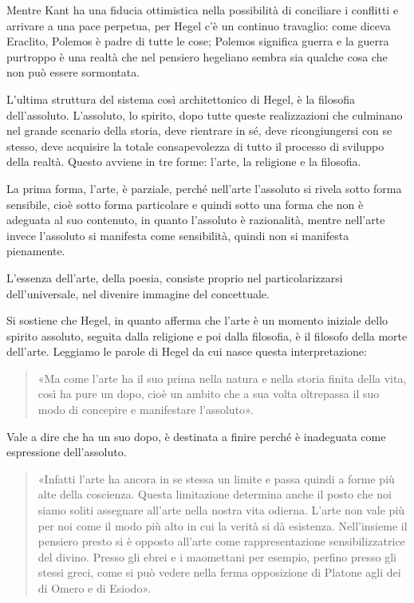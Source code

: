 \documentclass[a4paper,12pt,oneside,openany]{book}%
\begin{document}
Mentre Kant ha una fiducia ottimistica nella possibilità di conciliare i conflitti e arrivare a una pace perpetua, per Hegel c’è un continuo travaglio: come diceva Eraclito, Polemos è padre di tutte le cose; Polemos significa guerra e la guerra purtroppo è una realtà che nel pensiero hegeliano sembra sia qualche cosa che non può essere sormontata.

L’ultima struttura del sistema così architettonico di Hegel, è la filosofia dell’assoluto. L’assoluto, lo spirito, dopo tutte queste realizzazioni che culminano nel grande scenario della storia, deve rientrare in sé, deve ricongiungersi con se stesso, deve acquisire la totale consapevolezza di tutto il processo di sviluppo della realtà. Questo avviene in tre forme: l’arte, la religione e la filosofia.

La prima forma, l’arte, è parziale, perché nell’arte l’assoluto si rivela sotto forma sensibile, cioè sotto forma particolare e quindi sotto una forma che non è adeguata al suo contenuto, in quanto l’assoluto è razionalità, mentre nell’arte invece l’assoluto si manifesta come sensibilità, quindi non si manifesta pienamente.

L’essenza dell’arte, della poesia, consiste proprio nel particolarizzarsi dell’universale, nel divenire immagine del concettuale.

Si sostiene che Hegel, in quanto afferma che l’arte è un momento iniziale dello spirito assoluto, seguita dalla religione e poi dalla filosofia, è il filosofo della morte dell’arte. Leggiamo le parole di Hegel da cui nasce questa interpretazione:

\begin{quotation}
	«Ma come l’arte ha il suo prima nella natura e nella storia finita della vita, così ha pure un dopo, cioè un ambito che a sua volta oltrepassa il suo modo di concepire e manifestare l’assoluto».
\end{quotation}

Vale a dire che ha un suo dopo, è destinata a finire perché è inadeguata come espressione dell’assoluto.

\begin{quotation}
	«Infatti l’arte ha ancora in se stessa un limite e passa quindi a forme più alte della coscienza. Questa limitazione determina anche il posto che noi siamo soliti assegnare all’arte nella nostra vita odierna. L’arte non vale più per noi come il modo più alto in cui la verità si dà esistenza. Nell’insieme il pensiero presto si è opposto all’arte come rappresentazione sensibilizzatrice del divino. Presso gli ebrei e i maomettani per esempio, perfino presso gli stessi greci, come si può vedere nella ferma opposizione di Platone agli dei di Omero e di Esiodo».
\end{quotation}
\end{document}
